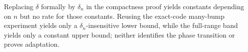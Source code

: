 Replacing \(\delta\) formally by \(\delta_n\) in the compactness proof yields constants depending on \(n\) but no rate for those constants.  Reusing the exact-code many-bump experiment yields only a \(\delta_n\)-insensitive lower bound, while the full-range band yields only a constant upper bound; neither identifies the phase transition or proves adaptation.